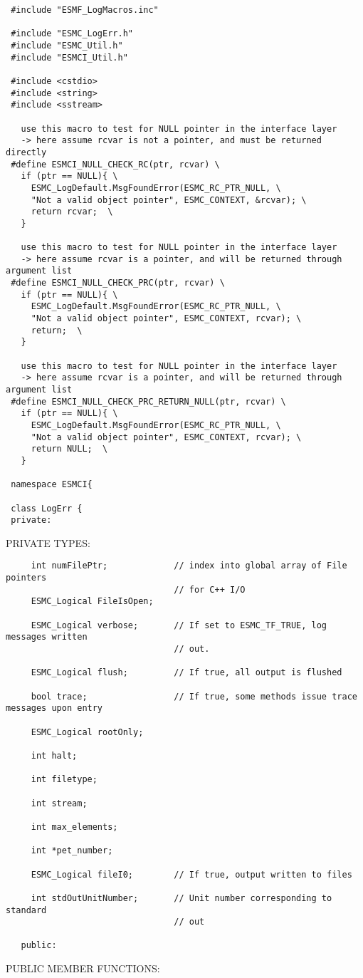 \begin{verbatim} 
 #include "ESMF_LogMacros.inc"
 
 #include "ESMC_LogErr.h"
 #include "ESMC_Util.h"
 #include "ESMCI_Util.h"
 
 #include <cstdio>
 #include <string>
 #include <sstream>
 
   use this macro to test for NULL pointer in the interface layer
   -> here assume rcvar is not a pointer, and must be returned directly
 #define ESMCI_NULL_CHECK_RC(ptr, rcvar) \
   if (ptr == NULL){ \
     ESMC_LogDefault.MsgFoundError(ESMC_RC_PTR_NULL, \
     "Not a valid object pointer", ESMC_CONTEXT, &rcvar); \
     return rcvar;  \
   }
 
   use this macro to test for NULL pointer in the interface layer
   -> here assume rcvar is a pointer, and will be returned through argument list
 #define ESMCI_NULL_CHECK_PRC(ptr, rcvar) \
   if (ptr == NULL){ \
     ESMC_LogDefault.MsgFoundError(ESMC_RC_PTR_NULL, \
     "Not a valid object pointer", ESMC_CONTEXT, rcvar); \
     return;  \
   }
 
   use this macro to test for NULL pointer in the interface layer
   -> here assume rcvar is a pointer, and will be returned through argument list
 #define ESMCI_NULL_CHECK_PRC_RETURN_NULL(ptr, rcvar) \
   if (ptr == NULL){ \
     ESMC_LogDefault.MsgFoundError(ESMC_RC_PTR_NULL, \
     "Not a valid object pointer", ESMC_CONTEXT, rcvar); \
     return NULL;  \
   }
 
 namespace ESMCI{
 
 class LogErr {
 private:\end{verbatim}{\sf PRIVATE TYPES:}
\begin{verbatim} 
     int numFilePtr;             // index into global array of File pointers
                                 // for C++ I/O
     ESMC_Logical FileIsOpen;
 
     ESMC_Logical verbose;       // If set to ESMC_TF_TRUE, log messages written
                                 // out.
 
     ESMC_Logical flush;         // If true, all output is flushed
 
     bool trace;                 // If true, some methods issue trace messages upon entry
 
     ESMC_Logical rootOnly;
 
     int halt;
 
     int filetype;
 
     int stream;
 
     int max_elements;
 
     int *pet_number;
                 
     ESMC_Logical fileI0;        // If true, output written to files
 
     int stdOutUnitNumber;       // Unit number corresponding to standard
                                 // out
 
   public:
 \end{verbatim}{\sf PUBLIC MEMBER FUNCTIONS:}
